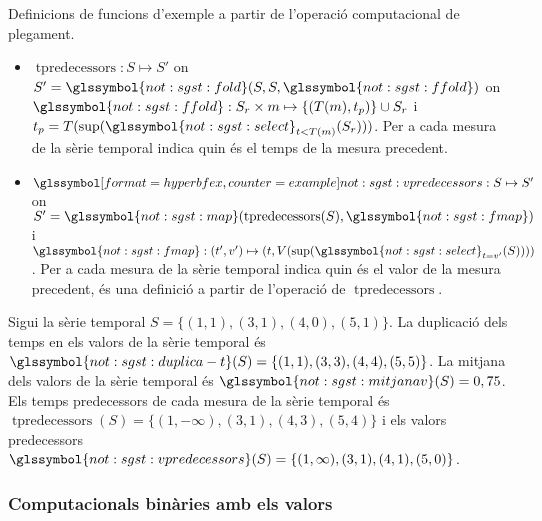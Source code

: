 \begin{example}
  Definicions de funcions d'exemple a partir de l'operació
  computacional de plegament. 

\begin{itemize}
\item  $\operatorname{tpredecessors}: S \mapsto S'$ on $S'=
  \glssymbol{not:sgst:fold}(S,S, \glssymbol{not:sgst:ffold})$ on $
  \glssymbol{not:sgst:ffold}: S_r\times m \mapsto \{(T(m),t_p)\} \cup
  S_r$ i $t_p=T(\sup( \glssymbol{not:sgst:select}_{t <
    T(m)}(S_r)))$. Per a cada mesura de la sèrie temporal indica quin
  és el temps de la mesura precedent.

\item $\glssymbolex{not:sgst:vpredecessors}: S \mapsto S'$ on $S'=
  \glssymbol{not:sgst:map}(\operatorname{tpredecessors}(S),
  \glssymbol{not:sgst:fmap})$ i $\glssymbol{not:sgst:fmap}:
  (t',v')\mapsto (t, V(\sup(\glssymbol{not:sgst:select}_{t=v'}(S))) ) $.
  Per a cada mesura de la sèrie temporal indica quin és el valor de la
  mesura precedent, és una definició a partir de l'operació de
  $\operatorname{tpredecessors}$.

\end{itemize}

\end{example}


\begin{example}
  Sigui la sèrie temporal $S=\{(1,1),(3,1),(4,0),(5,1)\}$. %
  La duplicació dels temps en els valors de la sèrie temporal és
  $\glssymbol{not:sgst:duplica-t}(S)=\{(1,1),(3,3),(4,4),(5,5)\}$. %
  La mitjana dels valors de la sèrie temporal és
  $\glssymbol{not:sgst:mitjanav}(S) = 0,75$. %
  Els temps predecessors de cada mesura de la sèrie temporal és
  $\operatorname{tpredecessors}(S)=\{(1,-\infty),(3,1),(4,3),(5,4)\}$
  i els valors predecessors
  $\glssymbol{not:sgst:vpredecessors}(S)=\{(1,\infty),(3,1),(4,1),(5,0)\}$.
\end{example}




\subsubsection{Computacionals binàries amb els valors}

